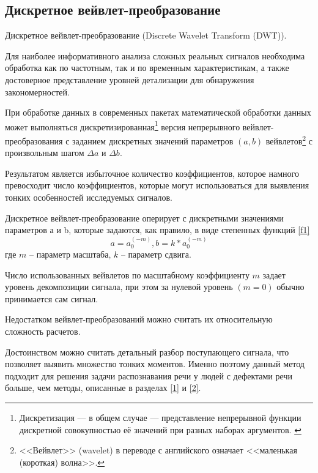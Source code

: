 \subsection{Дискретное вейвлет-преобразование}
Дискретное вейвлет-преобразование (Discrete Wavelet Transform (DWT)).

Для наиболее информативного анализа сложных реальных сигналов необходима обработка как по частотным, так и по временным характеристикам, а также достоверное представление уровней детализации для обнаружения закономерностей. 

При обработке данных в современных пакетах математической обработки данных может выполняться дискретизированная\footnote{Дискретизация — в общем случае — представление непрерывной функции дискретной совокупностью её значений при разных наборах аргументов. \cite{diskretiz}} версия непрерывного вейвлет-преобразования с заданием дискретных значений параметров $(a, b)$ вейвлетов\footnote{<<Вейвлет>> (wavelet) в переводе с английского означает <<маленькая (короткая) волна>>.} с произвольным шагом $\Delta a$ и $\Delta b$.

Результатом является избыточное количество коэффициентов, которое намного превосходит число коэффициентов, которые могут использоваться для выявления тонких особенностей исследуемых сигналов. 

Дискретное вейвлет-преобразование оперирует с дискретными значениями параметров а и b, которые задаются, как правило, в виде степенных функций \eqref{f1}
\begin{equation}
	\label{f1}
	a = a_0 ^{(-m)}, b = k * a_0 ^{(-m)}
\end{equation}
где $m$ -- параметр масштаба, $k$ -- параметр сдвига.

Число использованных вейвлетов по масштабному коэффициенту $m$ задает уровень декомпозиции сигнала, при этом за нулевой уровень $(m = 0)$ обычно принимается сам сигнал.


Недостатком вейвлет-преобразований можно считать их относительную сложность расчетов. 

Достоинством можно считать детальный разбор поступающего сигнала, что позволяет выявить множество тонких моментов. Именно поэтому данный метод подходит для решения задачи распознавания речи у людей с дефектами речи больше, чем методы, описанные в разделах \ref{1} и \ref{2}.
